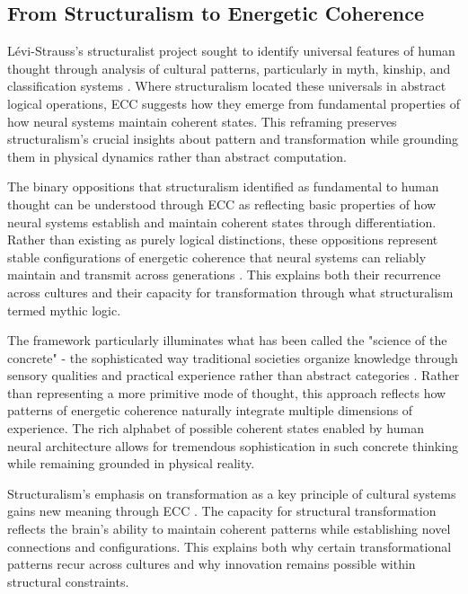 \subsection{From Structuralism to Energetic Coherence}

Lévi-Strauss's structuralist project sought to identify universal features of human thought through analysis of cultural patterns, particularly in myth, kinship, and classification systems \cite{levi1966savage}. Where structuralism located these universals in abstract logical operations, ECC suggests how they emerge from fundamental properties of how neural systems maintain coherent states. This reframing preserves structuralism's crucial insights about pattern and transformation while grounding them in physical dynamics rather than abstract computation.

The binary oppositions that structuralism identified as fundamental to human thought can be understood through ECC as reflecting basic properties of how neural systems establish and maintain coherent states through differentiation. Rather than existing as purely logical distinctions, these oppositions represent stable configurations of energetic coherence that neural systems can reliably maintain and transmit across generations \cite{piaget1971structuralism}. This explains both their recurrence across cultures and their capacity for transformation through what structuralism termed mythic logic.

The framework particularly illuminates what has been called the "science of the concrete" - the sophisticated way traditional societies organize knowledge through sensory qualities and practical experience rather than abstract categories \cite{levi1966savage}. Rather than representing a more primitive mode of thought, this approach reflects how patterns of energetic coherence naturally integrate multiple dimensions of experience. The rich alphabet of possible coherent states enabled by human neural architecture allows for tremendous sophistication in such concrete thinking while remaining grounded in physical reality.

Structuralism's emphasis on transformation as a key principle of cultural systems gains new meaning through ECC \cite{turner1982ritual}. The capacity for structural transformation reflects the brain's ability to maintain coherent patterns while establishing novel connections and configurations. This explains both why certain transformational patterns recur across cultures and why innovation remains possible within structural constraints.

